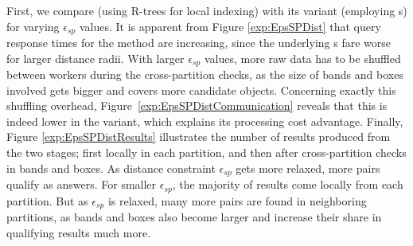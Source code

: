 
First, we compare \base (using R-trees for local indexing) with its \opt variant (employing {\btsr}s) for varying $\epsilon_{sp}$ values. It is apparent from Figure \ref{exp:EpsSPDist} that query response times for the \base method are increasing, since the underlying {\rtree}s fare worse for larger distance radii. With larger $\epsilon_{sp}$ values, more raw data has to be shuffled between workers during the cross-partition checks, as the size of bands and boxes involved gets bigger and covers more candidate objects. Concerning exactly this shuffling overhead, Figure~\ref{exp:EpsSPDistCommunication} reveals that this is indeed lower in the \opt variant, which explains its processing cost advantage. Finally, Figure \ref{exp:EpsSPDistResults} illustrates the number of results produced from the two stages; first locally in each partition, and then after cross-partition checks in bands and boxes. As distance constraint $\epsilon_{sp}$ gets more relaxed, more pairs qualify as answers. For smaller $\epsilon_{sp}$, the majority of results come locally from each partition. But as $\epsilon_{sp}$ is relaxed, many more pairs are found in neighboring partitions, as bands and boxes also become larger and increase their share in qualifying results much more.


